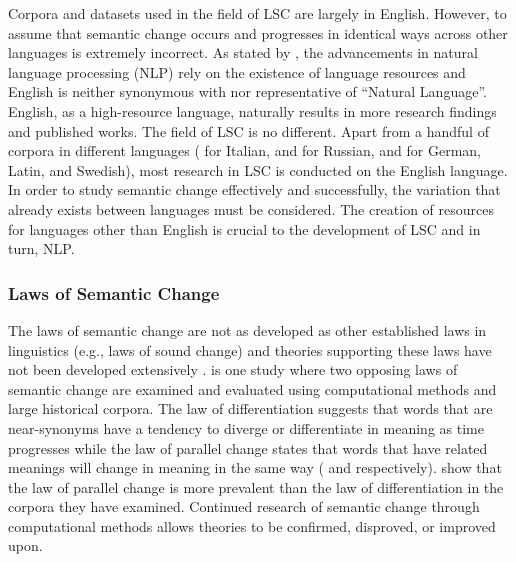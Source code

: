 Corpora and datasets used in the field of LSC are largely in English. However, to assume that semantic change occurs and progresses in identical ways across other languages is extremely incorrect. As stated by \citet{bender_2020}, the advancements in natural language processing (NLP) rely on the existence of language resources and English is neither synonymous with nor representative of “Natural Language”. English, as a high-resource language, naturally results in more research findings and published works. The field of LSC is no different. Apart from a handful of corpora in different languages (\citet{diacrita_evalita2020} for Italian, \citet{rodina-kutuzov-2020-rusemshift} and \citet{rushifteval2021} for Russian, and \citet{schlechtweg-etal-2020-semeval} for German, Latin, and Swedish), most research in LSC is conducted on the English language. In order to study semantic change effectively and successfully, the variation that already exists between languages must be considered. The creation of resources for languages other than English is crucial to the development of LSC and in turn, NLP.   


\subsubsection{Laws of Semantic Change}

The laws of semantic change are not as developed as other established laws in linguistics (e.g., laws of sound change) and theories supporting these laws have not been developed extensively \citep{Xu2015ACE}. \citet{Xu2015ACE} is one study where two opposing laws of semantic change are examined and evaluated using computational methods and large historical corpora. The law of differentiation suggests that words that are near-synonyms have a tendency to diverge or differentiate in meaning as time progresses while the law of parallel change states that words that have related meanings will change in meaning in the same way (\citet{breal1897essai} and \citet{stern-1921} respectively). \citet{Xu2015ACE} show that the law of parallel change is more prevalent than the law of differentiation in the corpora they have examined. Continued research of semantic change through computational methods allows theories to be confirmed, disproved, or improved upon. 

